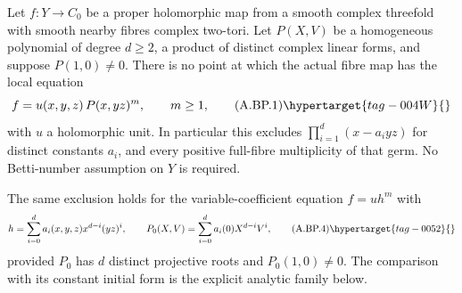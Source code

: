 \begin{proposition}\hypertarget{tag-01BC}{}\label{cdp:st:A.5.21}


Let $f:Y\to C_0$ be a proper holomorphic map from a smooth
complex threefold with smooth nearby fibres complex
two-tori. Let $P(X,V)$ be a homogeneous polynomial of
degree $d\ge2$, a product of distinct complex linear
forms, and suppose $P(1,0)\ne0$.
There is no point at which the actual fibre map has
the local equation
\[
             f=u(x,y,z)\,P(x,yz)^m,
             \qquad m\ge1,                         \tag{A.BP.1}\hypertarget{tag-004W}{}\label{cdp:eq:A.BP.1}
\]
with $u$ a holomorphic unit. In particular this excludes
$\prod_{i=1}^d(x-a_i yz)$ for distinct constants $a_i$,
and every positive full-fibre multiplicity of that germ.
No Betti-number assumption on $Y$ is required.

The same exclusion holds for the variable-coefficient
equation $f=u h^m$ with
\[
 h=\sum_{i=0}^d a_i(x,y,z)x^{d-i}(yz)^i,
 \qquad P_0(X,V)=\sum_{i=0}^d a_i(0)X^{d-i}V^i,
                                                        \tag{A.BP.4}\hypertarget{tag-0052}{}\label{cdp:eq:A.BP.4}
\]
provided $P_0$ has $d$ distinct projective roots and
$P_0(1,0)\ne0$. The comparison with its constant
initial form is the explicit analytic family below.
\end{proposition}
